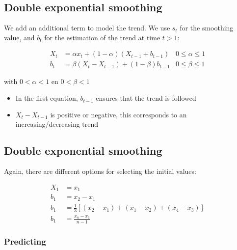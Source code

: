 \documentclass[aspectratio=169]{beamer}
\begin{document}
\begin{frame}
  \subsection{Double exponential smoothing}
  
  We add an additional term to model the trend. We use $s_t$ for the smoothing value, and $b_t$ for the estimation of the trend at time $t > 1$:
  
  \begin{align*}
  X_{t} & = \alpha x_{t} + (1-\alpha)(X_{t-1} + b_{t-1}) & 0 \leq \alpha \leq 1                            \\
  b_{t} & = \beta(X_{t}-X_{t-1}) + (1-\beta)b_{t-1}      & 0 \leq \beta \leq 1 
  \label{eq:doubleSmoothing}
  \end{align*}
  
  with $0 < \alpha < 1$ en $0 < \beta < 1$
  
  
  \begin{itemize}
    \item In the first equation, $b_{t-1}$ ensures that the trend is followed
    \item $X_{t}-X_{t-1}$ is positive or negative, this corresponds to an increasing/decreasing trend
  \end{itemize}
\end{frame}

\begin{frame}
  \subsection{Double exponential smoothing}
  Again, there are different options for selecting the initial values:
  
  \begin{align*}
  X_{1} &= x_{1} \\
  b_{1} &= x_{2} - x_{1} \\
  b_{1} &= \frac{1}{3}\left[ (x_{2} - x_{1}) + (x_{1} - x_{2}) + (x_{4} - x_{3}) \right]\\
  b_{1} &= \frac{x_{n} - x_{1}}{n-1}
  \end{align*}
  
\end{frame}

\subsubsection{Predicting}
\end{document}
